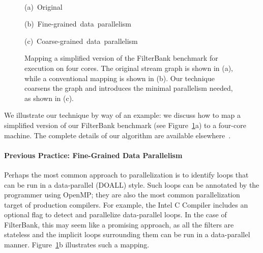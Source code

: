 \begin{figure}[t]

\begin{minipage}{0.3\textwidth}
\centering
{}
\end{minipage}
\hspace{0.1in}
\begin{minipage}{0.3\textwidth}
\centering
{}
\end{minipage}
\hspace{0.4in}
\begin{minipage}{0.3\textwidth}
\centering
{}
\end{minipage}

~ \\
\begin{minipage}{0.3\textwidth}
\centering
\mbox{{\small (a) Original}}
\end{minipage}
\hspace{0.1in}
\begin{minipage}{0.3\textwidth}
\mbox{{\small (b) Fine-grained data parallelism}}
\end{minipage}
\hspace{0.4in}
\begin{minipage}{0.3\textwidth}
\hspace{-14pt}\mbox{{\small (c) Coarse-grained data parallelism}}
\end{minipage}

\centering
\caption[Exploiting data parallelism in the FilterBank
  benchmark]{Mapping a simplified version of the FilterBank benchmark
  for execution on four cores.  The original stream graph is shown in
  (a), while a conventional mapping is shown in (b).  Our technique
  coarsens the graph and introduces the minimal parallelism needed, as
  shown in (c).\protect\label{fig:filterbank}}

\end{figure}

We illustrate our technique by way of an example: we discuss how to
map a simplified version of our FilterBank benchmark (see
Figure~\ref{fig:filterbank}a) to a four-core machine.  The complete
details of our algorithm are available
elsewhere~\cite{gordon06asplos}.

\paragraph*{Previous Practice: Fine-Grained Data Parallelism}  Perhaps 
the most common approach to parallelization is to identify loops that
can be run in a data-parallel (DOALL) style.  Such loops can be
annotated by the programmer using OpenMP; they are also the most
common parallelization target of production compilers.  For example,
the Intel C Compiler includes an optional flag to detect and
parallelize data-parallel loops.  In the case of FilterBank, this may
seem like a promising approach, as all the filters are stateless and
the implicit loops surrounding them can be run in a data-parallel
manner.  Figure~\ref{fig:filterbank}b illustrates such a mapping.

